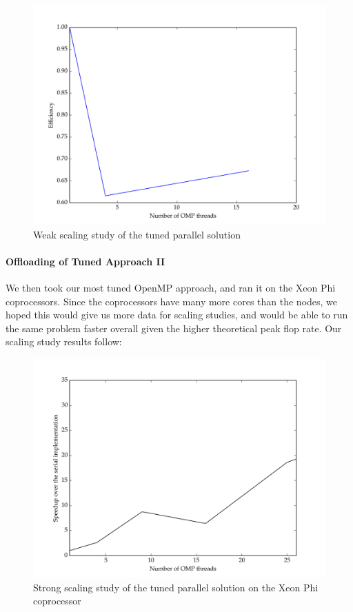 \documentclass[11pt]{article}
\begin{document}
\begin{figure}[H]
\centering
\includegraphics[scale=0.5]{./scaling_studies/weak_scaling_eric.png}
\caption{Weak scaling study of the tuned parallel solution}
\label{fig:ws_eric}
\end{figure}

\paragraph{Offloading of Tuned Approach II}
We then took our most tuned OpenMP approach, and ran it on the Xeon Phi coprocessors. Since the coprocessors have many more cores than the nodes, we hoped this would give us more data for scaling studies, and would be able to run the same problem faster overall given the higher theoretical peak flop rate. Our scaling study results follow:

\begin{figure}[H]
\centering
\includegraphics[scale=0.5]{./scaling_studies/strong_scaling_offload.png}
\caption{Strong scaling study of the tuned parallel solution on the Xeon Phi coprocessor}
\label{fig:ss_offload}
\end{figure}
\end{document}
